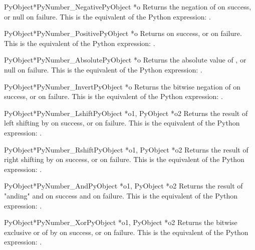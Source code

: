 \documentclass[twoside,openright]{report}
\begin{document}
\begin{cfuncdesc}{PyObject*}{PyNumber_Negative}{PyObject *o}
Returns the negation of  on success, or null on failure.
This is the equivalent of the Python expression: .
\end{cfuncdesc}


\begin{cfuncdesc}{PyObject*}{PyNumber_Positive}{PyObject *o}
Returns  on success, or \NULL{} on failure.
This is the equivalent of the Python expression: .
\end{cfuncdesc}


\begin{cfuncdesc}{PyObject*}{PyNumber_Absolute}{PyObject *o}
Returns the absolute value of , or null on failure.  This is
the equivalent of the Python expression: .
\end{cfuncdesc}


\begin{cfuncdesc}{PyObject*}{PyNumber_Invert}{PyObject *o}
Returns the bitwise negation of  on success, or \NULL{} on
failure.  This is the equivalent of the Python expression:
.
\end{cfuncdesc}


\begin{cfuncdesc}{PyObject*}{PyNumber_Lshift}{PyObject *o1, PyObject *o2}
Returns the result of left shifting  by  on success, or
\NULL{} on failure.  This is the equivalent of the Python
expression: .
\end{cfuncdesc}


\begin{cfuncdesc}{PyObject*}{PyNumber_Rshift}{PyObject *o1, PyObject *o2}
Returns the result of right shifting  by  on success, or
\NULL{} on failure.  This is the equivalent of the Python
expression: .
\end{cfuncdesc}


\begin{cfuncdesc}{PyObject*}{PyNumber_And}{PyObject *o1, PyObject *o2}
Returns the result of "anding"  and  on success and \NULL{}
on failure. This is the equivalent of the Python
expression: .
\end{cfuncdesc}


\begin{cfuncdesc}{PyObject*}{PyNumber_Xor}{PyObject *o1, PyObject *o2}
Returns the bitwise exclusive or of  by  on success, or
\NULL{} on failure.  This is the equivalent of the Python
expression: .
\end{cfuncdesc}
\end{document}
